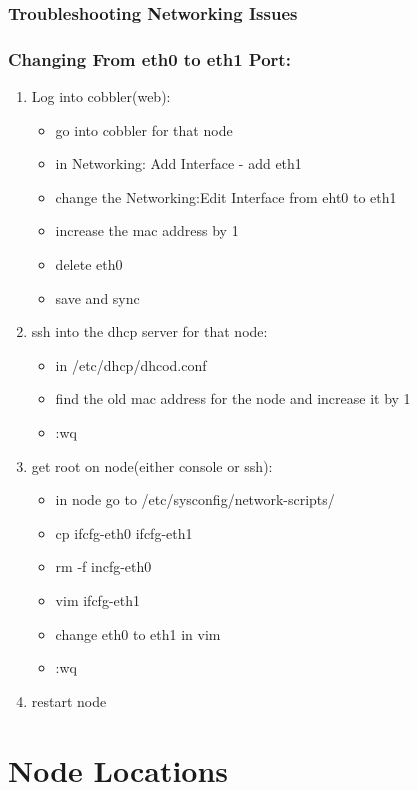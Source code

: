 \documentclass[10pt,letterpaper]{article}
\begin{document}
        \subsubsection{Troubleshooting Networking Issues}
        \subsubsection{Changing From eth0 to eth1 Port:}
        \begin{enumerate}
        \item Log into cobbler(web):
        	\begin{itemize}
			\item go into cobbler for that node
			\item in Networking: Add Interface - add eth1
			\item change the Networking:Edit Interface from eht0 to eth1
			\item increase the mac address by 1
            \item delete eth0 
        	\item save and sync
            \end{itemize}
		\item ssh into the dhcp server for that node:
			\begin{itemize}
            \item in /etc/dhcp/dhcod.conf
			\item find the old mac address for the node and increase it by 1
			\item :wq
            \end{itemize}
		\item get root on node(either console or ssh):
        	\begin{itemize}
			\item in node go to /etc/sysconfig/network-scripts/
			\item cp ifcfg-eth0 ifcfg-eth1
			\item rm -f incfg-eth0 
			\item vim ifcfg-eth1
			\item change eth0 to eth1 in vim
			\item :wq
            \end{itemize}
		\item restart node
		\end{enumerate}


\clearpage


\appendix
\section{Node Locations}
\end{document}
